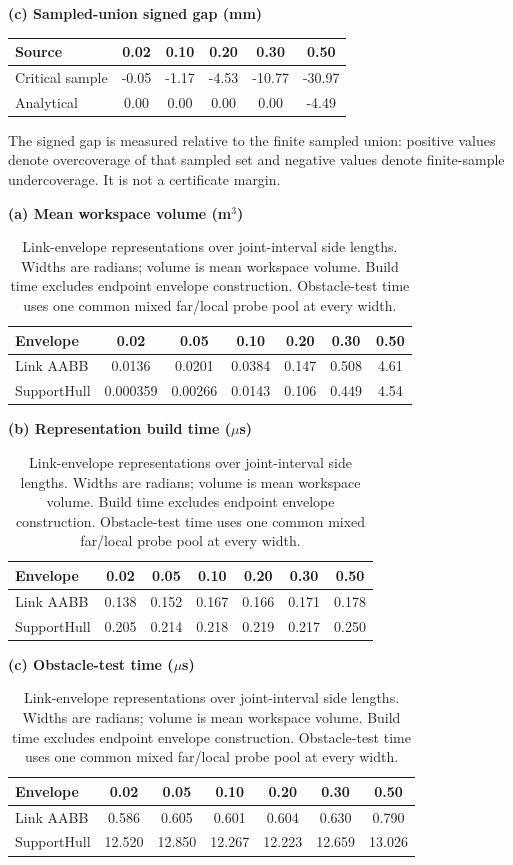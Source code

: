 \documentclass[journal]{IEEEtran}
\begin{document}
\begin{table}[!t]
\vspace{0.7ex}
\textbf{(c) Sampled-union signed gap (mm)}\\[0.3ex]
\begin{tabular}{@{}lccccc@{}}
\toprule
Source & 0.02 & 0.10 & 0.20 & 0.30 & 0.50 \\
\midrule
Critical sample & -0.05 & -1.17 & -4.53 & -10.77 & -30.97 \\
Analytical & 0.00 & 0.00 & 0.00 & 0.00 & -4.49 \\
\bottomrule
\end{tabular}
\par\vspace{0.45ex}
{\scriptsize The signed gap is measured relative to the finite sampled union:
positive values denote overcoverage of that sampled set and negative values
denote finite-sample undercoverage. It is not a certificate margin.}
\end{table}

\begin{table}[!t]
\centering
\caption{Link-envelope representations over joint-interval side lengths. Widths
are radians; volume is mean workspace volume. Build time excludes endpoint
envelope construction. Obstacle-test time uses one common mixed far/local probe pool at every width.}
\label{tab:mechanism_link}
\scriptsize
\setlength{\tabcolsep}{3.5pt}
\renewcommand{\arraystretch}{1.02}
\textbf{(a) Mean workspace volume (m$^3$)}\\[0.3ex]
\begin{tabular}{@{}lcccccc@{}}
\toprule
Envelope & 0.02 & 0.05 & 0.10 & 0.20 & 0.30 & 0.50 \\
\midrule
Link AABB & 0.0136 & 0.0201 & 0.0384 & 0.147 & 0.508 & 4.61 \\
SupportHull & 0.000359 & 0.00266 & 0.0143 & 0.106 & 0.449 & 4.54 \\
\bottomrule
\end{tabular}

\vspace{0.7ex}
\textbf{(b) Representation build time ($\mu$s)}\\[0.3ex]
\begin{tabular}{@{}lcccccc@{}}
\toprule
Envelope & 0.02 & 0.05 & 0.10 & 0.20 & 0.30 & 0.50 \\
\midrule
Link AABB & 0.138 & 0.152 & 0.167 & 0.166 & 0.171 & 0.178 \\
SupportHull & 0.205 & 0.214 & 0.218 & 0.219 & 0.217 & 0.250 \\
\bottomrule
\end{tabular}

\vspace{0.7ex}
\textbf{(c) Obstacle-test time ($\mu$s)}\\[0.3ex]
\begin{tabular}{@{}lcccccc@{}}
\toprule
Envelope & 0.02 & 0.05 & 0.10 & 0.20 & 0.30 & 0.50 \\
\midrule
Link AABB & 0.586 & 0.605 & 0.601 & 0.604 & 0.630 & 0.790 \\
SupportHull & 12.520 & 12.850 & 12.267 & 12.223 & 12.659 & 13.026 \\
\bottomrule
\end{tabular}
\end{table}
\end{document}
